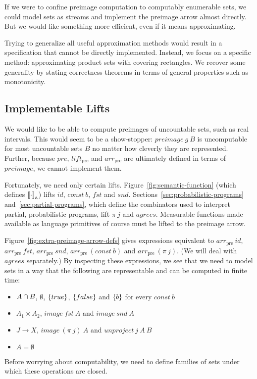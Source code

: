 \documentclass[preprint]{sigplanconf}
\newcommand{\arrowlift}{\ensuremath{lift}}
\newcommand{\arrowarr}{\ensuremath{arr}}
\newcommand{\gen}{_\mathrm{a}}
\newcommand{\pre}{_\mathrm{pre}}
\newcommand{\liftpre}{\arrowlift\pre}
\newcommand{\arrpre}{\arrowarr\pre}
\begin{document}
If we were to confine preimage computation to computably enumerable sets, we could model sets as streams and implement the preimage arrow almost directly.
But we would like something more efficient, even if it means approximating.

Trying to generalize all useful approximation methods would result in a specification that cannot be directly implemented.
Instead, we focus on a specific method: approximating product sets with covering rectangles.
We recover some generality by stating correctness theorems in terms of general properties such as monotonicity.

\subsection{Implementable Lifts}

We would like to be able to compute preimages of uncountable sets, such as real intervals.
This would seem to be a show-stopper: $preimage~g~B$ is uncomputable for most uncountable sets $B$ no matter how cleverly they are represented.
Further, because $pre$, $\liftpre$ and $\arrpre$ are ultimately defined in terms of $preimage$, we cannot implement them.

Fortunately, we need only certain lifts.
Figure~\ref{fig:semantic-function} (which defines $\meaningof{\cdot}\gen$) lifts $id$, $const~b$, $fst$ and $snd$.
Sections~\ref{sec:probabilistic-programs} and~\ref{sec:partial-programs}, which define the combinators used to interpret partial, probabilistic programs, lift $\pi~j$ and $agrees$.
Measurable functions made available as language primitives of course must be lifted to the preimage arrow.

Figure~\ref{fig:extra-preimage-arrow-defs} gives expressions equivalent to $\arrpre~id$, $\arrpre~fst$, $\arrpre~snd$, $\arrpre~(const~b)$ and $\arrpre~(\pi~j)$.
(We will deal with $agrees$ separately.)
By inspecting these expressions, we see that we need to model sets in a way that
the following are representable and can be computed in finite time:
\begin{itemize}
	\item $A \cap B$, $\emptyset$, $\{{true}\}$, $\{{false}\}$ and $\{{b}\}$ for every $const~b$
	\item $A_1 \times A_2$, $image~fst~A$ and $image~snd~A$
	\item $J \to X$, $image~(\pi~j)~A$ and $unproject~j~A~B$
	\item $A = \emptyset$
\end{itemize}
Before worrying about computability, we need to define families of sets under which these operations are closed.
\end{document}
